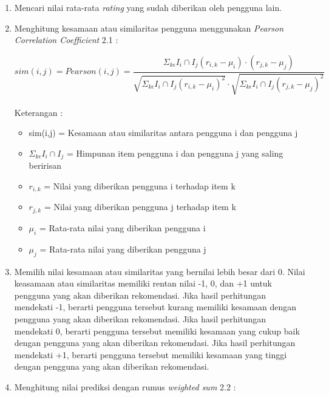 \begin{enumerate}
	\item Mencari nilai rata-rata \textit{rating} yang sudah diberikan oleh pengguna lain.
	
	\item Menghitung kesamaan atau similaritas pengguna menggunakan \textit{Pearson Correlation Coefficient} 2.1 :
	
	\begin{equation}
		sim(i,j) = Pearson(i,j) = \frac{\Sigma _{k\epsilon} I_{i} \cap I_{j} (r_{i,k}-\mu_{i}) \cdot (r_{j,k}-\mu_{j})}{\sqrt{\Sigma _{k\epsilon} I_{i} \cap I_{j} (r_{i,k}-\mu_{i})^2} \cdot \sqrt{\Sigma _{k\epsilon} I_{i} \cap I_{j} (r_{j,k}-\mu_{j})^2 }}
	\end{equation}\leavevmode \\
	Keterangan : 
	\begin{itemize}
		\item sim(i,j) = Kesamaan atau similaritas antara pengguna i dan pengguna j
		
		\item $\Sigma _{k\epsilon} I_{i} \cap I_{j}$ = Himpunan item pengguna i dan pengguna j yang saling beririsan
		
		\item $r_{i,k}$ = Nilai yang diberikan pengguna i terhadap item k
		
		\item $r_{j,k}$ = Nilai yang diberikan pengguna j terhadap item k
		
		\item $\mu_{i}$ = Rata-rata nilai yang diberikan pengguna i
		
		\item $\mu_{j}$ = Rata-rata nilai yang diberikan pengguna j
	\end{itemize}\leavevmode
	
	\item Memilih nilai kesamaan atau similaritas yang bernilai lebih besar dari 0. Nilai keasamaan atau similaritas memiliki rentan nilai -1, 0, dan +1 untuk pengguna yang akan diberikan rekomendasi. Jika hasil perhitungan mendekati -1, berarti pengguna tersebut kurang memiliki kesamaan dengan pengguna yang akan diberikan rekomendasi. Jika hasil perhitungan mendekati 0, berarti pengguna tersebut memiliki kesamaan yang cukup baik dengan pengguna yang akan diberikan rekomendasi. Jika hasil perhitungan mendekati +1, berarti pengguna tersebut memiliki kesamaan yang tinggi dengan pengguna yang akan diberikan rekomendasi.
	\item Menghitung nilai prediksi dengan rumus \textit{weighted sum} 2.2 :
	

\end{enumerate}
